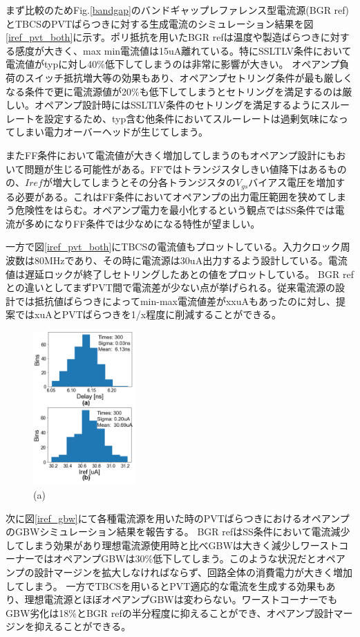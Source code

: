 \documentclass[letterpaper, 10 pt, conference]{ieeeconf}  %
\begin{document}
まず比較のためFig.\ref{bandgap}のバンドギャップレファレンス型電流源(BGR ref)\cite{banba1999cmos}とTBCSのPVTばらつきに対する生成電流のシミュレーション結果を図\ref{iref_pvt_both}に示す。ポリ抵抗を用いたBGR refは温度や製造ばらつきに対する感度が大きく、max min電流値は15uA離れている。特にSSLTLV条件において電流値がtypに対し40\%低下してしまうのは非常に影響が大きい。
オペアンプ負荷のスイッチ抵抗増大等の効果もあり、オペアンプセトリング条件が最も厳しくなる条件で更に電流源値が20\%も低下してしまうとセトリングを満足するのは厳しい。オペアンプ設計時にはSSLTLV条件のセトリングを満足するようにスルーレートを設定するため、typ含む他条件においてスルーレートは過剰気味になってしまい電力オーバーヘッドが生じてしまう。

またFF条件において電流値が大きく増加してしまうのもオペアンプ設計にもおいて問題が生じる可能性がある。FFではトランジスタしきい値降下はあるものの、$I{ref}$が増大してしまうとその分各トランジスタの$V_{gs}$バイアス電圧を増加する必要がある。これはFF条件においてオペアンプの出力電圧範囲を狭めてしまう危険性をはらむ。オペアンプ電力を最小化するという観点ではSS条件では電流が多めになりFF条件では少なめになる特性が望ましい。

一方で図\ref{iref_pvt_both}にTBCSの電流値もプロットしている。入力クロック周波数は80MHzであり、その時に電流源は30uA出力するよう設計している。電流値は遅延ロックが終了しセトリングしたあとの値をプロットしている。
BGR refとの違いとしてまずPVT間で電流差が少ない点が挙げられる。従来電流源の設計では抵抗値ばらつきによってmin-max電流値差がxxuAもあったのに対し、提案ではxuAとPVTばらつきを1/x程度に削減することができる。

\begin{figure}[!]
\centering
 \includegraphics[width=0.35\textwidth]{figs/mc.png}
  \caption{(a) 
}
\label{monte}
\end{figure}

次に図\ref{iref_gbw}にて各種電流源を用いた時のPVTばらつきにおけるオペアンプのGBWシミュレーション結果を報告する。
BGR refはSS条件において電流減少してしまう効果があり理想電流源使用時と比べGBWは大きく減少しワーストコーナーではオペアンプGBWは30\%低下してしまう。このような状況だとオペアンプの設計マージンを拡大しなければならず、回路全体の消費電力が大きく増加してしまう。
一方でTBCSを用いるとPVT適応的な電流を生成する効果もあり、理想電流源とほぼオペアンプGBWは変わらない。ワーストコーナーでもGBW劣化は18\%とBGR refの半分程度に抑えることができ、オペアンプ設計マージンを抑えることができる。
\end{document}
